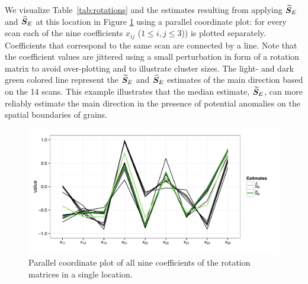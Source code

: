 We visualize Table~\ref{tab:rotations} and the estimates resulting from applying ${\widetilde{\bm S}_E}$ and ${\widehat{\bm S}_E}$ at this location in Figure \ref{fig:pcp} using a parallel coordinate plot: for every scan each of the nine coefficients $x_{ij}$ ($1 \le i,j \le 3$)) is plotted separately. Coefficients that correspond to the same scan are connected by a line.   Note that the coefficient values are jittered using a small perturbation in form of a rotation matrix to avoid over-plotting and to illustrate cluster sizes. The light- and dark green colored line represent the ${\widetilde{\bm S}_E}$ and ${\widehat{\bm S}_E}$ estimates of the main direction based on the 14 scans.   This example  illustrates that the median estimate, ${\widetilde{\bm S}_E}$,  can more reliably estimate the main direction in the presence of potential anomalies on the spatial boundaries of grains.



\begin{figure}[htbp] %
   \centering
   \includegraphics[width=.7\textwidth]{images/pcp.pdf} 
   \caption{ \label{fig:pcp}Parallel coordinate plot of all nine coefficients of the rotation matrices in a single location. }
\end{figure}

